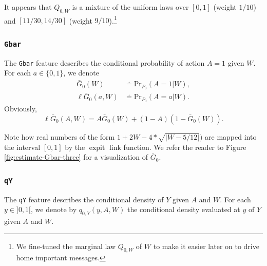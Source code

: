 \documentclass[
  11pt,
  openright,twoside]{book}
\newenvironment{Shaded}{\begin{snugshade}}{\end{snugshade}}
\newcommand{\CommentTok}[1]{\textcolor[rgb]{0.56,0.35,0.01}{\textit{#1}}}
\newcommand{\NormalTok}[1]{#1}
\newcommand{\SpecialCharTok}[1]{\textcolor[rgb]{0.00,0.00,0.00}{#1}}
\DeclareMathOperator{\expit}{expit}
\newcommand{\defq}{\doteq}
\newcommand{\Gbar}{\bar{G}}
\renewcommand{\Pr}{\textrm{Pr}}
\theoremstyle{definition}
\theoremstyle{definition}
\theoremstyle{definition}
\theoremstyle{definition}
\theoremstyle{remark}
\begin{document}
It appears that \(Q_{0,W}\) is a mixture of the uniform laws over \([0,1]\)
(weight \(1/10\)) and \([11/30,14/30]\) (weight \(9/10\)).\footnote{We fine-tuned the
  marginal law \(Q_{0,W}\) of \(W\) to make it easier later on to drive home
  important messages.}

\hypertarget{gbar}{%
\subsubsection*{\texorpdfstring{\texttt{Gbar}}{Gbar}}\label{gbar}}

The \texttt{Gbar} feature describes the conditional probability of action \(A = 1\)
given \(W\). For each \(a \in \{0,1\}\), we denote \begin{align*}  \Gbar_0(W)
&\defq \Pr_{P_0}(A  = 1 |  W), \\\ell\Gbar_0(a,W)  &\defq \Pr_{P_0}(A =  a |
W).\end{align*} Obviously, \begin{equation*}\ell\Gbar_{0}(A,W)    =
A\Gbar_{0}(W) + (1-A) (1-\Gbar_{0}(W)).\end{equation*}

\begin{Shaded}
\end{Shaded}

Note how real numbers of the form \(1 + 2W - 4 * \sqrt{|W - 5/12|})\) are mapped
into the interval \([0,1]\) by the \(\expit\) link function. We refer the reader
to Figure \ref{fig:estimate-Gbar-three} for a visualization of \(\Gbar_{0}\).

\hypertarget{qy}{%
\subsubsection*{\texorpdfstring{\texttt{qY}}{qY}}\label{qy}}

The \texttt{qY} feature describes the conditional density of \(Y\) given \(A\) and \(W\).
For each \(y\in ]0,1[\), we denote by \(q_{0,Y}(y, A, W)\) the conditional density
evaluated at \(y\) of \(Y\) given \(A\) and \(W\).
\end{document}
